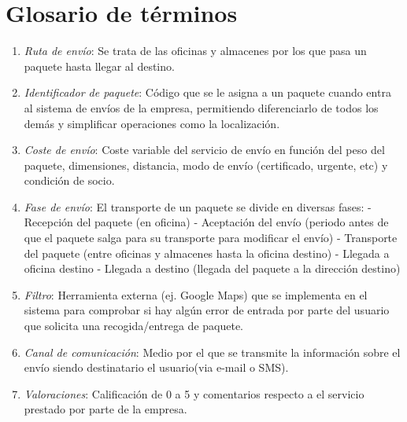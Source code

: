 \section{Glosario de términos}
	\begin{enumerate}
		\item \textit{Ruta de envío}: Se trata de las oficinas y almacenes por los que pasa un paquete hasta llegar al destino.
		\item \textit{Identificador de paquete}: Código que se le asigna a un paquete cuando entra al sistema de envíos de la empresa, permitiendo diferenciarlo de todos los demás y simplificar operaciones como la localización.
		\item \textit{Coste de envío}: Coste variable del servicio de envío en función del peso del paquete, dimensiones, distancia, modo de envío (certificado, urgente, etc) y condición de socio.
		\item \textit{Fase de envío}: El transporte de un paquete se divide en diversas fases: \newline - Recepción del paquete (en oficina)
		\newline - Aceptación del envío (periodo antes de que el paquete salga para su transporte para modificar el envío)
		\newline - Transporte del paquete (entre oficinas y almacenes hasta la oficina destino)
		\newline - Llegada a oficina destino
		\newline - Llegada a destino (llegada del paquete a la dirección destino)
		\item \textit{Filtro}: Herramienta externa (ej. Google Maps) que se implementa  en el sistema para comprobar si hay algún error de entrada por parte del usuario que solicita una recogida/entrega de paquete.
		\item \textit{Canal de comunicación}: Medio por el que se transmite la información sobre el envío siendo destinatario el usuario(via e-mail o SMS).
		\item \textit{Valoraciones}: Calificación de 0 a 5 y comentarios respecto a el servicio prestado por parte de la empresa.
		
 	\end{enumerate}
\newpage


